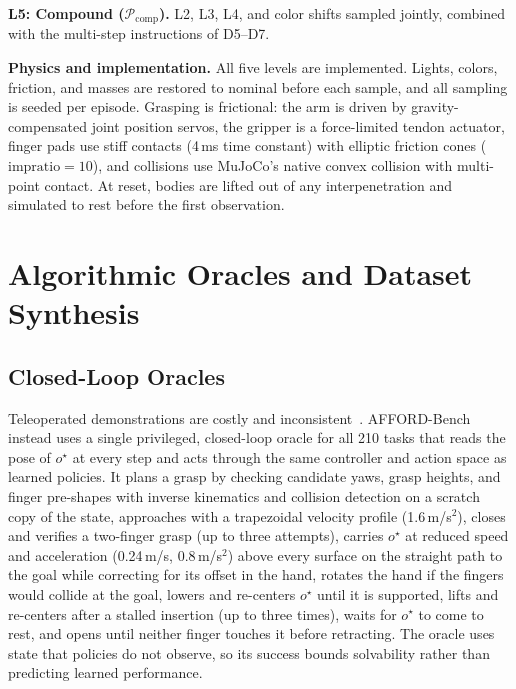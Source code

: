 \documentclass[conference]{IEEEtran}
\begin{document}
\textbf{L5: Compound ($\mathcal{P}_{\mathrm{comp}}$).} L2, L3, L4, and color shifts sampled jointly, combined with the multi-step instructions of D5--D7.

\textbf{Physics and implementation.} All five levels are implemented. Lights, colors, friction, and masses are restored to nominal before each sample, and all sampling is seeded per episode. Grasping is frictional: the arm is driven by gravity-compensated joint position servos, the gripper is a force-limited tendon actuator, finger pads use stiff contacts (4\,ms time constant) with elliptic friction cones ($\text{impratio}=10$), and collisions use MuJoCo's native convex collision with multi-point contact. At reset, bodies are lifted out of any interpenetration and simulated to rest before the first observation.

\section{Algorithmic Oracles and Dataset Synthesis}
\label{sec:oracles}

\subsection{Closed-Loop Oracles}
Teleoperated demonstrations are costly and inconsistent~\cite{mandlekar2021robomimic}. AFFORD-Bench instead uses a single privileged, closed-loop oracle for all 210 tasks that reads the pose of $o^\star$ at every step and acts through the same controller and action space as learned policies. It plans a grasp by checking candidate yaws, grasp heights, and finger pre-shapes with inverse kinematics and collision detection on a scratch copy of the state, approaches with a trapezoidal velocity profile (1.6\,m/s$^2$), closes and verifies a two-finger grasp (up to three attempts), carries $o^\star$ at reduced speed and acceleration (0.24\,m/s, 0.8\,m/s$^2$) above every surface on the straight path to the goal while correcting for its offset in the hand, rotates the hand if the fingers would collide at the goal, lowers and re-centers $o^\star$ until it is supported, lifts and re-centers after a stalled insertion (up to three times), waits for $o^\star$ to come to rest, and opens until neither finger touches it before retracting. The oracle uses state that policies do not observe, so its success bounds solvability rather than predicting learned performance.
\end{document}
